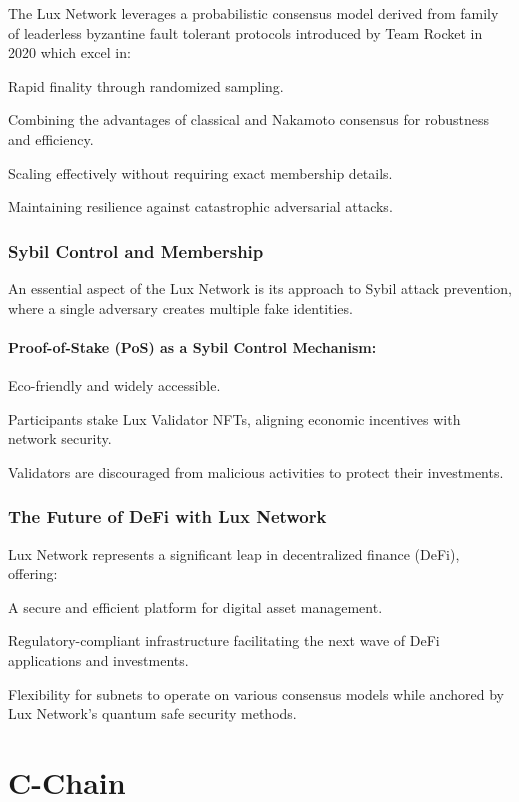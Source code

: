 \documentclass[11pt]{article}
\begin{document}
The Lux Network leverages a probabilistic consensus model derived from family of leaderless byzantine fault tolerant protocols introduced by Team Rocket in 2020 which excel in:


Rapid finality through randomized sampling.


Combining the advantages of classical and Nakamoto consensus for robustness and efficiency.


Scaling effectively without requiring exact membership details.


Maintaining resilience against catastrophic adversarial attacks.


\subsubsection{Sybil Control and Membership}

An essential aspect of the Lux Network is its approach to Sybil attack prevention, where a single adversary creates multiple fake identities.


\paragraph{Proof-of-Stake (PoS) as a Sybil Control Mechanism:}

Eco-friendly and widely accessible.


Participants stake Lux Validator NFTs, aligning economic incentives with network security.


Validators are discouraged from malicious activities to protect their investments.


\subsubsection{The Future of DeFi with Lux Network}

Lux Network represents a significant leap in decentralized finance (DeFi), offering:


A secure and efficient platform for digital asset management.


Regulatory-compliant infrastructure facilitating the next wave of DeFi applications and investments.


Flexibility for subnets to operate on various consensus models while anchored by Lux Network's quantum safe security methods.


\section{C-Chain}
\end{document}
